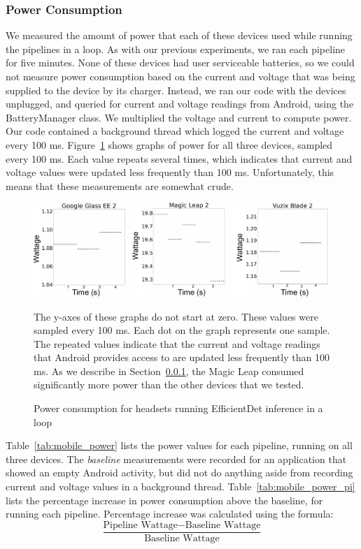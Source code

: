\subsubsection{Power Consumption}\label{sec:mobile_power_consumption}

We measured the amount of power that each of these devices used while running
the pipelines in a loop.
As with our previous experiments, we ran each pipeline for five minutes.
None of these devices had user serviceable batteries, so we could not measure
power consumption based on the current and voltage that was being
supplied to the device by its charger.
Instead, we ran our code with the devices unplugged, and queried for current and
voltage readings from Android, using the BatteryManager class.
We multiplied the voltage and current to compute power.
Our code contained a background thread which logged the current and voltage
every 100 ms.
Figure~\ref{fig:power_graphs} shows graphs of power for all three devices,
sampled every 100 ms.
Each value repeats several times, which indicates that current and voltage
values were updated less frequently than 100 ms.
Unfortunately, this means that these measurements are somewhat crude.

\begin{figure}
  \includegraphics[width=\textwidth]{figures/power_graphs.pdf}
  \begin{captiontext}
    The y-axes of these graphs do not start at zero.
    These values were sampled every 100 ms.
    Each dot on the graph represents one sample.
    The repeated values indicate that the current and voltage readings that
    Android provides access to are updated less frequently than 100 ms.
    As we describe in Section~\ref{sec:mobile_power_consumption}, the Magic Leap
    consumed significantly more power than the other devices that we tested.
  \end{captiontext}
  \caption{
    Power consumption for headsets running EfficientDet inference in a loop
  }\label{fig:power_graphs}
\end{figure}

Table~\ref{tab:mobile_power} lists the power values for each pipeline, running
on all three devices.
The \emph{baseline} measurements were recorded for an application that showed an
empty Android activity, but did not do anything aside from recording current and
voltage values in a background thread.
Table~\ref{tab:mobile_power_pi} lists the percentage increase in power
consumption above the baseline, for running each pipeline.
Percentage increase was calculated using the formula:
\[
  \frac{\text{Pipeline Wattage} - \text{Baseline Wattage}}{
    \text{Baseline Wattage}}
\]

